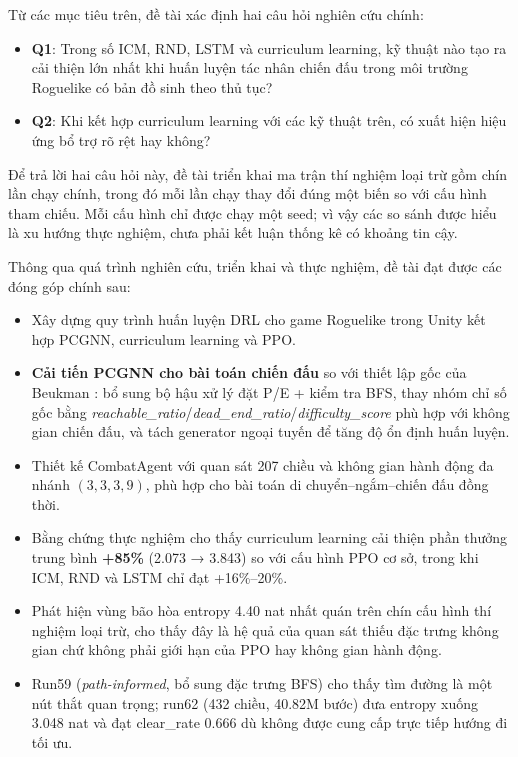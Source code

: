 \vspace{0.5cm}

Từ các mục tiêu trên, đề tài xác định hai câu hỏi nghiên cứu chính:

\renewcommand{\labelitemi}{$-$}
\begin{itemize}
    \item \textbf{Q1}: Trong số ICM, RND, LSTM và curriculum learning, kỹ thuật nào tạo ra cải thiện lớn nhất khi huấn luyện tác nhân chiến đấu trong môi trường Roguelike có bản đồ sinh theo thủ tục?
    \item \textbf{Q2}: Khi kết hợp curriculum learning với các kỹ thuật trên, có xuất hiện hiệu ứng bổ trợ rõ rệt hay không?
\end{itemize}

Để trả lời hai câu hỏi này, đề tài triển khai ma trận thí nghiệm loại trừ gồm chín lần chạy chính, trong đó mỗi lần chạy thay đổi đúng một biến so với cấu hình tham chiếu. Mỗi cấu hình chỉ được chạy một seed; vì vậy các so sánh được hiểu là xu hướng thực nghiệm, chưa phải kết luận thống kê có khoảng tin cậy.

\vspace{0.3cm}


Thông qua quá trình nghiên cứu, triển khai và thực nghiệm, đề tài đạt được các đóng góp chính sau:

\renewcommand{\labelitemi}{$-$}
\begin{itemize}
    \item Xây dựng quy trình huấn luyện DRL cho game Roguelike trong Unity kết hợp PCGNN, curriculum learning và PPO.
    \item \textbf{Cải tiến PCGNN cho bài toán chiến đấu} so với thiết lập gốc của Beukman \cite{Beukman2022}: bổ sung bộ hậu xử lý đặt P/E + kiểm tra BFS, thay nhóm chỉ số gốc bằng \emph{reachable\_ratio}/\emph{dead\_end\_ratio}/\emph{difficulty\_score} phù hợp với không gian chiến đấu, và tách generator ngoại tuyến để tăng độ ổn định huấn luyện.
    \item Thiết kế CombatAgent với quan sát 207 chiều và không gian hành động đa nhánh $(3,3,3,9)$, phù hợp cho bài toán di chuyển--ngắm--chiến đấu đồng thời.
    \item Bằng chứng thực nghiệm cho thấy curriculum learning cải thiện phần thưởng trung bình \textbf{+85\%} (2.073 → 3.843) so với cấu hình PPO cơ sở, trong khi ICM, RND và LSTM chỉ đạt +16\%--20\%.
    \item Phát hiện vùng bão hòa entropy 4.40 nat nhất quán trên chín cấu hình thí nghiệm loại trừ, cho thấy đây là hệ quả của quan sát thiếu đặc trưng không gian chứ không phải giới hạn của PPO hay không gian hành động.
    \item Run59 (\emph{path-informed}, bổ sung đặc trưng BFS) cho thấy tìm đường là một nút thắt quan trọng; run62 (432 chiều, 40.82M bước) đưa entropy xuống 3.048 nat và đạt clear\_rate 0.666 dù không được cung cấp trực tiếp hướng đi tối ưu.
\end{itemize}

